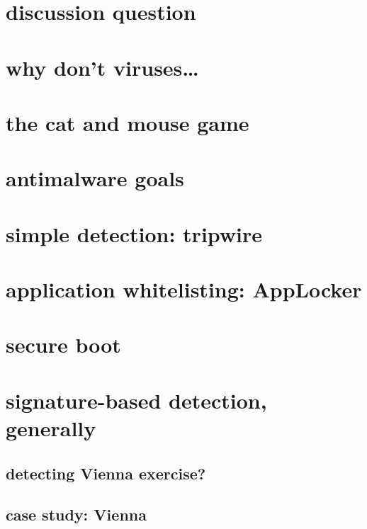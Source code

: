 \section{discussion question}


\section{why don't viruses\ldots}


\section{the cat and mouse game}


\section{antimalware goals}


\section{simple detection: tripwire} 


\section{application whitelisting: AppLocker}


\section{secure boot}


\section{signature-based detection, generally}



\subsection{detecting Vienna exercise?}


\subsection{case study: Vienna}


